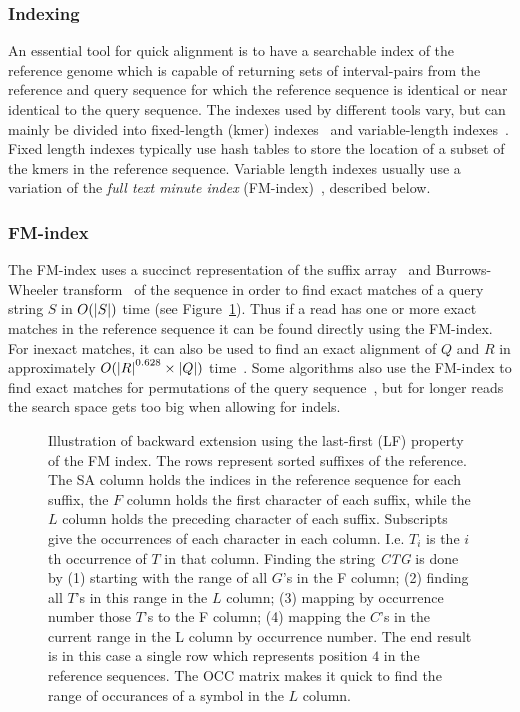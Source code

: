 \subsubsection{Indexing}
An essential tool for quick alignment is to have a searchable index of the reference genome which is capable of returning sets of interval-pairs from the reference and query sequence for which the reference sequence is identical or near identical to the query sequence.
The indexes used by different tools vary, but can mainly be divided into fixed-length (kmer) indexes~\cite{minimap} and variable-length indexes~\cite{bowtie2, bwalong}.
Fixed length indexes typically use hash tables to store the location of a subset of the kmers in the reference sequence.
Variable length indexes usually use a variation of the \emph{full text minute index} (FM-index)~\cite{fm}, described below.

\subsubsection{FM-index}
The FM-index uses a succinct representation of the suffix array~\cite{suffixarray} and Burrows-Wheeler transform~\cite{BWT} of the sequence in order to find exact matches of a query string $S$ in $O(\left|S\right|)$ time (see Figure~\ref{fig:FM}).
Thus if a read has one or more exact matches in the reference sequence it can be found directly using the FM-index.
For inexact matches, it can also be used to find an exact alignment of $Q$ and $R$ in approximately $O(\left|R\right|^{0.628}\times\left|Q\right|)$ time~\cite{bwtsw, bwalong}.
Some algorithms also use the FM-index to find exact matches for permutations of the query sequence~\cite{bowtie1, bwashort}, but for longer reads the search space gets too big when allowing for indels.
\begin{figure}
  \tikzpicture
  
  \endtikzpicture
  \caption{Illustration of backward extension using the last-first (LF) property of the FM index.
    The rows represent sorted suffixes of the reference. The SA column holds the indices in the reference sequence for each suffix, the $F$ column holds the first character of each suffix, while the $L$ column holds the preceding character of each suffix.
    Subscripts give the occurrences of each character in each column. I.e. $T_i$ is the $i$th occurrence of $T$ in that column. Finding the string \emph{CTG} is done by (1) starting with the range of all $G$'s in the F column; (2) finding all $T$'s in this range in the $L$ column; (3) mapping by occurrence number those $T$'s to the F column; (4) mapping the $C$'s in the current range in the L column by occurrence number. The end result is in this case a single row which represents position $4$ in the reference sequences.
    The OCC matrix makes it quick to find the range of occurances of a symbol in the $L$ column.
  }
  \label{fig:FM}

\end{figure}

